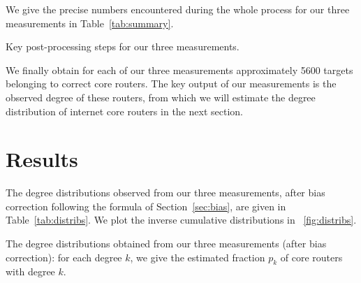 \documentclass[conference]{IEEEtran}
\newcommand{\noteperso}[1]{\begin{center}
\fbox{\begin{minipage}{0.9\columnwidth}#1\end{minipage}}\end{center}}
\begin{document}
We give the precise numbers encountered during the whole process for our three measurements in Table~\ref{tab:summary}.

\begin{table} \centering
\resizebox{.9\columnwidth}{!}{}
\smallskip
\caption{Key post-processing steps for our three measurements.}
\label{tab:summary}
\end{table}

We finally obtain for each of our three measurements approximately 5600 targets belonging to correct core routers. The key output of our measurements is the observed degree of these routers, from which we will estimate the degree distribution of internet core routers in the next section.



\section{Results}
\label{sec:results}
\label{sec:observed-distrib}

The degree distributions observed from our three measurements, after bias correction following the formula of Section~\ref{sec:bias}, are given in Table~\ref{tab:distribs}. We plot the inverse cumulative distributions in \figurename~\ref{fig:distribs}.

\begin{table} \centering
\resizebox{.98\columnwidth}{!}{}
\smallskip
\caption{The degree distributions obtained from our three measurements (after bias correction): for each degree $k$, we give the estimated fraction $p_k$ of core routers with degree $k$.}
\label{tab:distribs}
\end{table}
\end{document}
